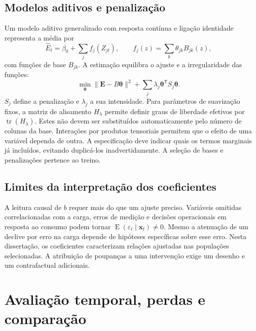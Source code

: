 \subsection{Modelos aditivos e penalização}
\label{sec:mat-gam}
Um modelo aditivo generalizado com resposta contínua e ligação identidade representa a média por
\begin{equation}
\widehat E_t=\beta_0+\sum_j f_j(Z_{jt}),
\qquad f_j(z)=\sum_k\theta_{jk}B_{jk}(z),
\label{eq:mat-gam}
\end{equation}
com funções de base $B_{jk}$. A estimação equilibra o ajuste e a irregularidade das funções\parencite{HastieTibshirani1986,Wood2017}:
\begin{equation}
\min_{\boldsymbol\theta}\|\boldsymbol E-B\boldsymbol\theta\|^2
+\sum_j\lambda_j\boldsymbol\theta^{\mathsf T}S_j\boldsymbol\theta.
\label{eq:mat-penalizacao}
\end{equation}
$S_j$ define a penalização e $\lambda_j$ a sua intensidade. Para parâmetros de suavização fixos, a matriz de alisamento $H_\lambda$ permite definir graus de liberdade efetivos por $\operatorname{tr}(H_\lambda)$. Estes não devem ser substituídos automaticamente pelo número de colunas da base. Interações por produtos tensoriais permitem que o efeito de uma variável dependa de outra. A especificação deve indicar quais os termos marginais já incluídos, evitando duplicá-los inadvertidamente. A seleção de bases e penalizações pertence ao treino.

\subsection{Limites da interpretação dos coeficientes}
\label{sec:mat-causalidade}
A leitura causal de $b$ requer mais do que um ajuste preciso. Variáveis omitidas correlacionadas com a carga, erros de medição e decisões operacionais em resposta ao consumo podem tornar $\operatorname{E}(\varepsilon_t\mid\boldsymbol x_t)\neq0$. Mesmo a atenuação de um declive por erro na carga depende de hipóteses específicas sobre esse erro. Nesta dissertação, os coeficientes caracterizam relações ajustadas nas populações selecionadas. A atribuição de poupanças a uma intervenção exige um desenho e um contrafactual adicionais.

\section{Avaliação temporal, perdas e comparação}
\label{sec:mat-avaliacao-temporal}

